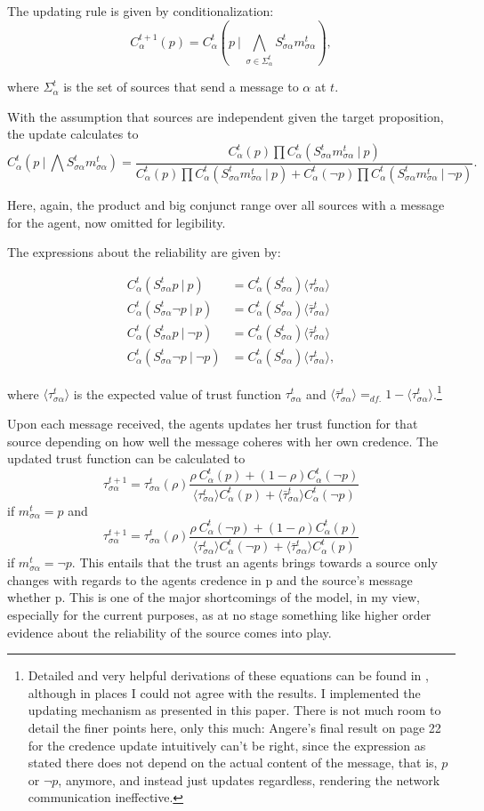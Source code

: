 \documentclass[11pt, a4paper]{article}
\newcommand{\Stsa}{S^t_{\sigma\alpha}}
\newcommand{\sa}{{\sigma\alpha}}
\newcommand{\given}[1][]{\:#1\vert\:}
\newcommand{\Sm}{\Stsa m^t_{\sa}}
\renewcommand{\a}{\alpha}
\begin{document}
The updating rule is given by conditionalization:
\[
    C^{t+1}_\alpha (p) = C^t_\alpha (p \given \bigwedge_{\sigma \in \Sigma^t_\alpha} \Stsa m^t_{\sa}),
\]

where $\Sigma^t_\alpha$ is the set of sources that send a message to $\alpha$ at $t$.

With the assumption that sources are independent given the target proposition, the update calculates to
\[
    C^t_\a (p \given \bigwedge \Sm) 
    = \frac{ C^t_\a (p) \prod C^t_\a (\Sm \given p) }
    { C^t_\a (p) \prod C^t_\a (\Sm \given p) +  C^t_\a (\neg p) \prod C^t_\a (\Sm \given \neg p) }.
\]

Here, again, the product and big conjunct range over all sources with a message for the agent, now omitted for legibility.   

The expressions about the reliability are given by:

\begin{align*}
    C^t_\a (\Stsa p \given p) &= C^t_\a (\Stsa) \langle \tau^t_{\sa} \rangle \\
    C^t_\a (\Stsa \neg p \given p) &= C^t_\a (\Stsa) \langle \bar{\tau}^t_{\sa} \rangle \\
    C^t_\a (\Stsa p \given \neg p) &= C^t_\a (\Stsa) \langle \bar{\tau}^t_{\sa} \rangle \\
    C^t_\a (\Stsa \neg p \given \neg p) &= C^t_\a (\Stsa) \langle \tau^t_{\sa} \rangle,
\end{align*}

where $\langle \tau^t_{\sa} \rangle $ is the expected value of trust function $ \tau^t_{\sa} $ and ${\langle \bar{\tau}^t_{\sa} \rangle =_{df.} 1 - \langle \tau^t_{\sa} \rangle}$.\footnote{Detailed and very helpful derivations of these equations can be found in \textcite{Angere2010}, although in places I could not agree with the results. I implemented the updating mechanism as presented in this paper. There is not much room to detail the finer points here, only this much: Angere's final result on page 22 for the credence update intuitively can't be right, since the expression as stated there does not depend on the actual content of the message, that is, $p$ or $\neg p$, anymore, and instead just updates regardless, rendering the network communication ineffective.} 

Upon each message received, the agents updates her trust function for that source depending on how well the message coheres with her own credence. The updated trust function can be calculated to
\[
    \tau^{t+1}_\sa = \tau^t_\sa (\rho) \frac{\rho \: C^t_\a (p) + (1 - \rho) C^t_\a (\neg p)}
    {\langle \tau^t_\sa \rangle C^t_\a(p) + \langle \bar{\tau}^t_\sa \rangle C^t_\a(\neg p)}
\]
if $m^t_{\sa} = p$ and 
\[
    \tau^{t+1}_\sa = \tau^t_\sa (\rho) \frac{\rho \: C^t_\a (\neg p) + (1 - \rho) C^t_\a (p)}
    {\langle \tau^t_\sa \rangle C^t_\a(\neg p) + \langle \bar{\tau}^t_\sa \rangle C^t_\a(p)}
\]
if $m^t_{\sa} = \neg p$. This entails that the trust an agents brings towards a source only changes with regards to the agents credence in p and the source's message whether p. This is one of the major shortcomings of the model, in my view, especially for the current purposes, as at no stage something like higher order evidence about the reliability of the source comes into play. 
\end{document}
